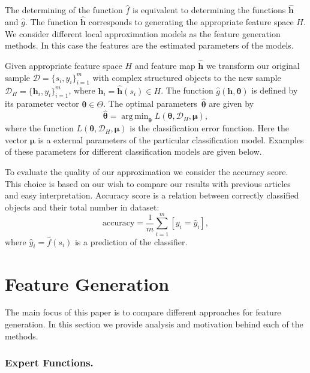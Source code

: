 \documentclass{llncs}
\DeclareMathOperator*{\argmin}{arg\,min}
\begin{document}
The determining of the function $\hat{f}$ is equivalent to determining the functions $\hat{\bm{h}}$ and  $\hat{g}$. 
The function $\hat{\bm{h}}$ corresponds to generating the appropriate feature space $H$. 
We consider different local approximation models as the feature generation methods. 
In this case the features are the estimated parameters of the models.

Given appropriate feature space $H$ and feature map $\hat{\bm{h}}$ we transform our original sample $\mathcal{D} = \{s_i, y_i\}_{i=1}^m$ with complex structured objects to the new sample $\mathcal{D}_H = \{\mathbf{h}_i, y_i\}_{i=1}^m$, where $\mathbf{h}_i = \hat{\bm{h}}(s_i) \in H$. 
The function $\hat{g}(\mathbf{h}, \bm{\theta})$ is defined by its parameter vector $\bm{\theta} \in \Theta$. 
The optimal parameters~$\hat{\bm{\theta}}$ are given by
\begin{equation}
\hat{\bm{\theta}} = \argmin_{\bm{\theta}} L(\bm{\theta}, \mathcal{D}_H, \bm{\mu}),
\label{eq::optimal_classification_params}
\end{equation}
where the function $L(\bm{\theta}, \mathcal{D}_H, \bm{\mu})$ is the classification error function. Here the vector $\bm{\mu}$ is a external parameters of the particular classification model. Examples of these parameters for different classification models are given below.

To evaluate the quality of our approximation we consider the accuracy score. 
This choice is based on our wish to compare our results with previous articles~\cite{karasikov2016feature, ivkin2015ts} and easy interpretation. 
Accuracy score is a relation between correctly classified objects and their total number in dataset:
\begin{equation*}
\mathrm{accuracy} = \frac{1}{m} \sum_{i=1}^{m} [y_i = \hat{y}_i],
\end{equation*}
where $\hat{y}_i = \hat{f}(s_i)$ is a prediction of the classifier. 

\section{Feature Generation}

The main focus of this paper is to compare different approaches for feature generation. In this section we provide analysis and motivation behind each of the methods.

\subsubsection{Expert Functions.}
\end{document}
